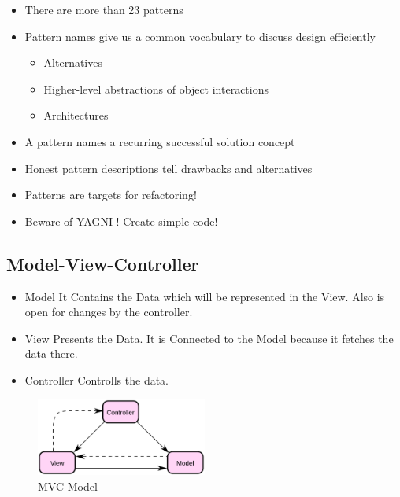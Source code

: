 \begin{itemize}
\tightlist
\item
  There are more than 23 patterns
\item
  Pattern names give us a common vocabulary to discuss design
  efficiently

  \begin{itemize}
  \tightlist
  \item
    Alternatives
  \item
    Higher-level abstractions of object interactions
  \item
    Architectures
  \end{itemize}
\item
  A pattern names a recurring successful solution concept
\item
  Honest pattern descriptions tell drawbacks and alternatives
\item
  Patterns are targets for refactoring!
\item
  Beware of YAGNI ! Create simple code!
\end{itemize}




\subsection{Model-View-Controller}
\begin{itemize}
    \item Model
    \subitem It Contains the Data which will be represented in the View. Also is open for changes by the controller.
    \item View
    \subitem Presents the Data. It is Connected to the Model because it fetches the data there.
    \item Controller
    \subitem Controlls the data. 
\end{itemize}

\begin{figure}[H]
\centering
\includegraphics[width=0.5\textwidth]{figures/MVC.png}
\caption{MVC Model}
\end{figure}




